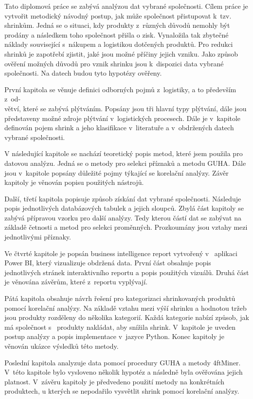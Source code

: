 Tato diplomová práce se zabývá analýzou dat vybrané společnosti. Cílem práce je vytvořit metodický návodný postup, jak může společnost přistupovat k~tzv. shrinkům.
Jedná se o situaci, kdy produkty z~různých důvodů nemohly být prodány a následkem toho společnost přišla o zisk. Vynaložila tak zbytečné náklady související s~nákupem a logistikou dotčených produktů. 
Pro redukci shrinků je zapotřebí zjistit, jaké jsou možné příčiny jejich vzniku.
Jako způsob ověření možných důvodů pro vznik shrinku jsou k~dispozici data vybrané společnosti. Na datech budou tyto hypotézy ověřeny. 

První kapitola se věnuje definici odborných pojmů z~logistiky, a to především z~od-\\větví, které se zabývá plýtváním. Popsány jsou tři hlavní typy plýtvání, dále jsou představeny možné zdroje plýtvání v~logistických procesech. Dále je v~kapitole definován pojem shrink a jeho klasifikace v~literatuře a v~obdržených datech vybrané společnosti.


V následující kapitole se nachází teoretický popis metod, které jsem použila pro datovou analýzu. Jedná se o metody pro selekci příznaků a metodu GUHA. Dále jsou v~kapitole popsány důležité pojmy týkající se korelační analýzy. Závěr kapitoly je věnován popisu použitých nástrojů.

Další, třetí kapitola popisuje způsob získání dat vybrané společnosti. Následuje popis jednotlivých databázových tabulek a jejich sloupců. Zbylá část kapitoly se zabývá přípravou vzorku pro další analýzy. Tedy kterou částí dat se zabývat na základě četnosti a metod pro selekci proměnných. Prozkoumány jsou vztahy mezi jednotlivými příznaky.

Ve čtvrté kapitole je popsán business intelligence report vytvořený v~ aplikaci Power BI, který vizualizuje obdržená data. První část obsahuje popis jednotlivých stránek interaktivního reportu a popis použitých vizuálů. Druhá část je věnována závěrům, které z~reportu vyplývají.

Pátá kapitola obsahuje návrh řešení pro kategorizaci shrinkovaných produktů pomocí korelační analýzy. Na základě vztahu mezi výší shrinku a hodnotou tržeb jsou produkty rozděleny do několika kategorií. Každá kategorie nabízí způsob, jak má společnost s~ produkty nakládat, aby snížila shrink. V~kapitole je uveden postup analýzy a popis implementace v~jazyce Python. Konec kapitoly je věnován ukázce výsledků této metody.

Poslední kapitola analyzuje data pomocí procedury GUHA a metody 4ftMiner. V~této kapitole bylo vysloveno několik hypotéz a následně byla ověřována jejich platnost. V~závěru kapitoly je předvedeno použití metody na konkrétních produktech, u kterých se nepodařilo vysvětlit shrink pomocí korelační analýzy.


